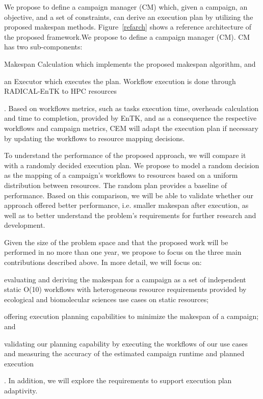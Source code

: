 We propose to define a campaign manager (CM) which, given a campaign, an objective, 
and a set of constraints, can derive an execution plan by utilizing the proposed 
makespan methods. Figure~\ref{refarch} shows a reference architecture of the proposed 
framework.We propose to define a campaign manager (CM). CM has two sub-components: 
\begin{inparaenum}[(1)]
\item Makespan Calculation which implements the proposed makespan algorithm, and 
\item an Executor which executes the plan. Workflow execution is done through 
RADICAL-EnTK to HPC resources
\end{inparaenum}.
Based on workflows metrics, such as tasks execution time, overheads calculation 
and time to completion, provided by EnTK,  and as a consequence the respective 
workflows and campaign metrics, CEM will adapt the execution plan if necessary 
by updating the workflows to resource mapping decisions.

To understand the performance of the proposed approach, we will compare it with 
a randomly decided execution plan. We propose to model a random decision as the 
mapping of a campaign’s workflows to resources based on a uniform distribution 
between resources. The random plan provides a baseline of performance. Based on 
this comparison, we will be able to validate whether our approach offered better 
performance, i.e. smaller makespan after execution, as well as to better 
understand the problem’s requirements for further research and development.

Given the size of the problem space and that the proposed work will be performed 
in no more than one year, we propose to focus on the three main contributions 
described above. In more detail, we will focus on: 
\begin{inparaenum}[(1)]
\item evaluating and deriving the makespan for a campaign as a set of independent 
static O(10) workflows with heterogeneous resource requirements provided by 
ecological and biomolecular sciences use cases on static resources; 
\item offering execution planning capabilities to minimize the makespan of a 
campaign; and 
\item validating our planning capability by executing the workflows of our use 
cases and measuring the accuracy of the estimated campaign runtime and planned 
execution
\end{inparaenum}. In addition, we will explore the requirements to support 
execution plan adaptivity.

